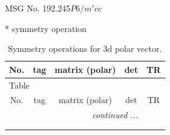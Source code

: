 \documentclass[fleqn,8pt]{jsarticle}
\begin{document}
\setcounter{MaxMatrixCols}{32}

\renewcommand{\tablename}{Table~}
\renewcommand{\figurename}{Figure~}
\begin{center}
\LARGE
MSG No. 192.245\quad$P6/m'cc$
\end{center}
* symmetry operation
\renewcommand{\arraystretch}{1.3}
\begin{longtable}{ccccc}
\caption{Symmetry operations for 3d polar vector.}
 \\
 \hline \hline
No. & tag & matrix (polar) & det & TR \\ \hline \endfirsthead

\multicolumn{4}{l}{\tablename\ \thetable{}} \\
 \hline \hline
No. & tag & matrix (polar) & det & TR \\ \hline \endhead

 \hline \hline
\multicolumn{4}{r}{\footnotesize\it continued ...} \\ \endfoot

 \hline \hline
\multicolumn{4}{r}{} \\ \endlastfoot


\end{longtable}
\end{document}
